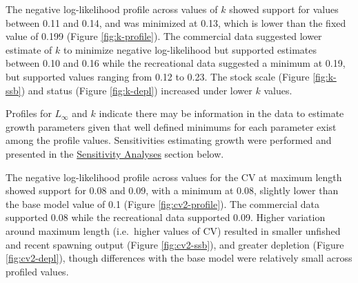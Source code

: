 \documentclass[11pt,
  english,
  a4paper,
]{article}
\begin{document}
\leavevmode\tagmcend\tagstructend\par


The negative log-likelihood profile across values of {\(k\)\leavevmode\tagmcend\tagstructend} showed support for values between 0.11 and 0.14, and was minimized at 0.13, which is lower than the fixed value of 0.199 (Figure \ref{fig:k-profile}). The commercial data suggested lower estimate of {\(k\)\leavevmode\tagmcend\tagstructend} to minimize negative log-likelihood but supported estimates between 0.10 and 0.16 while the recreational data suggested a minimum at 0.19, but supported values ranging from 0.12 to 0.23. The stock scale (Figure \ref{fig:k-ssb}) and status (Figure \ref{fig:k-depl}) increased under lower {\(k\)\leavevmode\tagmcend\tagstructend} values.

\leavevmode\tagmcend\tagstructend\par


Profiles for {\(L_{\infty}\)\leavevmode\tagmcend\tagstructend} and {\(k\)\leavevmode\tagmcend\tagstructend} indicate there may be information in the data to estimate growth parameters given that well defined minimums for each parameter exist among the profile values. Sensitivities estimating growth were performed and presented in the {\protect\hyperlink{sensitivity-analyses}{Sensitivity Analyses}\leavevmode\tagmcend\tagstructend} section below.

\leavevmode\tagmcend\tagstructend\par


The negative log-likelihood profile across values for the CV at maximum length showed support for 0.08 and 0.09, with a minimum at 0.08, slightly lower than the base model value of 0.1 (Figure \ref{fig:cv2-profile}). The commercial data supported 0.08 while the recreational data supported 0.09. Higher variation around maximum length (i.e.~higher values of CV) resulted in smaller unfished and recent spawning output (Figure \ref{fig:cv2-ssb}), and greater depletion (Figure \ref{fig:cv2-depl}), though differences with the base model were relatively small across profiled values.
\end{document}
